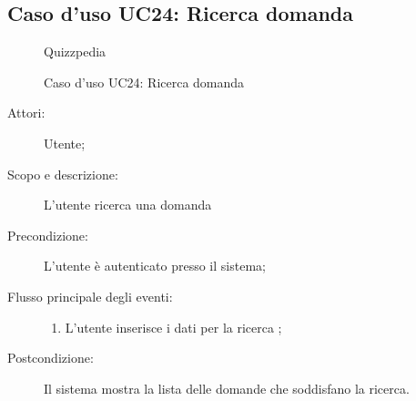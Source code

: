 \subsection{Caso d'uso UC24: Ricerca domanda}
        \begin{figure}[H]
            \centering
            \begin{resizedtikzpicture}{\textwidth}
		\begin{umlsystem}[x=0, fill=lightgray!20]{Quizzpedia}
		\end{umlsystem}
            \end{resizedtikzpicture}
            \caption{Caso d'uso UC24: Ricerca domanda}
            \label{fig:UC24} 
        \end{figure}
    \begin{description}
\item[Attori:] Utente;
\item[Scopo e descrizione:] L'utente ricerca una domanda
      \item[Precondizione:] L'utente è autenticato presso il sistema;

        \item[Flusso principale degli eventi:] \begin{enumerate}
          \item L'utente inserisce i dati per la ricerca	;

      \end{enumerate}
    \item[Postcondizione:] Il sistema mostra la lista delle domande che soddisfano la ricerca.
  \end{description}
\hypertarget{UC25}{}
